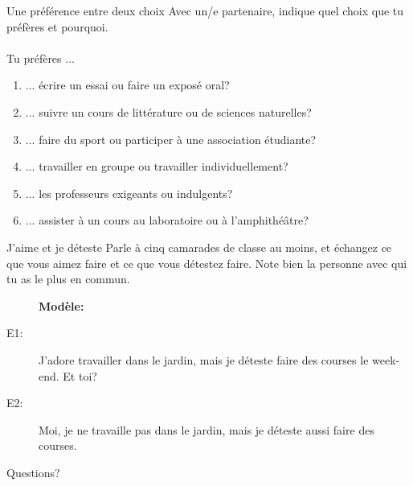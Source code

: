 \documentclass{beamer}
\begin{document}
  \begin{frame}{Une préférence entre deux choix}
    Avec un/e partenaire, indique quel choix que tu préfères et pourquoi. \\
     \\
    \vspace{1cm}
    Tu préfères ...
    \begin{enumerate}
      \item ... écrire un essai ou faire un exposé oral?
      \item ... suivre un cours de littérature ou de sciences naturelles?
      \item ... faire du sport ou participer à une association étudiante?
      \item ... travailler en groupe ou travailler individuellement?
      \item ... les professeurs exigeants  ou indulgents?
      \item ... assister à un cours au laboratoire ou à l'amphithéâtre?
    \end{enumerate}
  \end{frame}

  \begin{frame}{J'aime et je déteste}
    Parle à cinq camarades de classe au moins, et échangez ce que vous aimez faire et ce que vous détestez faire.
    Note bien la personne avec qui tu as le plus en commun. \\
    \begin{center}
      \begin{description}
        \item[] \textbf{Modèle:}
        \item[E1:] J'adore travailler dans le jardin, mais je déteste faire des courses le week-end. Et toi?
        \item[E2:] Moi, je ne travaille pas dans le jardin, mais je déteste aussi faire des courses.
      \end{description}
    \end{center}
  \end{frame}

  \begin{frame}{}
    \begin{center}
      \Large Questions?
    \end{center}
  \end{frame}
\end{document}

